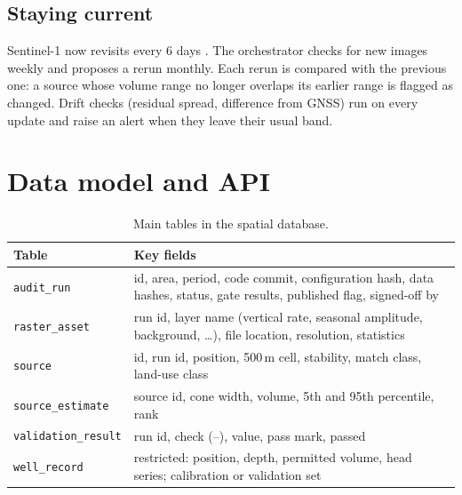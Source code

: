 \subsection{Staying current}

Sentinel-1 now revisits every 6 days \cite{s1status}. The orchestrator checks for new images weekly
and proposes a rerun monthly. Each rerun is compared with the previous one: a source whose volume
range no longer overlaps its earlier range is flagged as changed. Drift checks (residual spread,
difference from GNSS) run on every update and raise an alert when they leave their usual band.

\section{Data model and API}

{\small
\begin{xltabular}{\linewidth}{@{}L{31mm}Y@{}}
\caption{Main tables in the spatial database.}\label{tab:datamodel}\\*
\toprule
\textbf{Table} & \textbf{Key fields}\\*
\midrule
\texttt{audit\_run} & id, area, period, code commit, configuration hash, data hashes, status, gate results,
  published flag, signed-off by\\
\texttt{raster\_asset} & run id, layer name (vertical rate, seasonal amplitude, background, \ldots), file
  location, resolution, statistics\\
\texttt{source} & id, run id, position, 500\,m cell, stability, match class, land-use class\\
\texttt{source\_estimate} & source id, cone width, volume, 5th and 95th percentile, rank\\
\texttt{validation\_result} & run id, check (--), value, pass mark, passed\\
\texttt{well\_record} & restricted: position, depth, permitted volume, head series; calibration or
  validation set\\
\bottomrule
\end{xltabular}}

